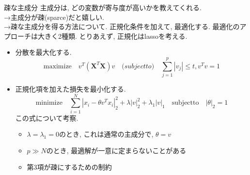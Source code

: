 \documentclass[dvipdfmx,8pt]{beamer}
\begin{document}
  \begin{frame}{疎な主成分}
    主成分は, どの変数が寄与度が高いかを教えてくれる. \\
    →主成分が疎(sparce)だと嬉しい. \\
    →疎な主成分を得る方法について. 正規化条件を加えて, 最適化する.
    最適化のアプローチは大きく2種類. とりあえず, 正規化はlassoを考える.
    \begin{itemize}
      \item 分散を最大化する.
        \[
          \mathrm{maximize} \quad v^T(\mathbf{X}^T\mathbf{X})v \quad \mathrm(subject to) \quad \sum_{j=1}^p|v_j| \le t, v^Tv=1
        \]
      \item 正規化項を加えた損失を最小化する.
        \[
          \mathrm{minimize} \quad \sum_{i=1}^N|x_i-\theta v^Tx_i|_2^2+\lambda|v|_2^2+\lambda_1|v|_1 \quad \mathrm{subject to} \quad |\theta|_2=1
        \]
        この式について考察.
        \begin{itemize}
          \item $\lambda=\lambda_1=0$のとき, これは通常の主成分で, $\theta=v$
          \item $p \gg N$のとき, 最適解が一意に定まらないことがある
          \item 第3項が疎にするための制約
        \end{itemize}
    \end{itemize}
  \end{frame}
\end{document}
